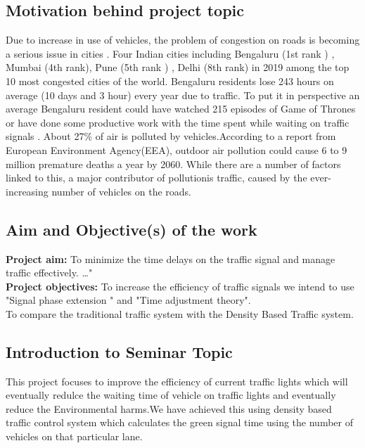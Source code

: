 \documentclass[12pt,a4paper]{report}
\begin{document}
\subsection{ Motivation behind project topic}

Due to increase in use of vehicles, the problem of congestion on roads is becoming a serious issue in cities .
Four Indian cities including Bengaluru (1st rank )  , Mumbai (4th rank), Pune (5th rank ) ,  Delhi (8th rank) in 2019 among the top 10 most congested cities of the world.
Bengaluru residents lose 243 hours on average (10 days and 3 hour) every year due to traffic. To put it in perspective an average Bengaluru resident could have watched 215 episodes of Game of Thrones or have done some productive work with the time spent while waiting on traffic signals .
About 27\% of air is polluted by vehicles.According to a report from European Environment Agency(EEA), outdoor air pollution could cause 6 to 9 million premature deaths a year by 2060. While there are a number of factors linked to this, a major contributor of pollutionis traffic, caused by the ever-increasing number of vehicles on the roads. 

\subsection{ Aim and Objective(s) of the work}

\textbf{Project aim:}
	 To minimize the time delays on the traffic signal and manage traffic effectively.
\ldots "
\\

\textbf{Project objectives:} 
	To increase the efficiency of traffic signals we intend to use 
	"Signal phase extension " and "Time adjustment theory".
\\
To compare the traditional traffic system with the Density Based Traffic system. 


\subsection{ Introduction to Seminar Topic}
This project  focuses to improve the efficiency of current traffic lights which will eventually redulce the waiting time of vehicle on traffic lights and eventually reduce the Environmental harms.We have achieved this using density based traffic control system which calculates the green signal time using the number of vehicles on that particular lane.
\end{document}
